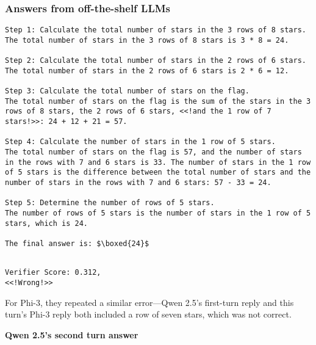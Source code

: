 \subsubsection{Answers from off-the-shelf LLMs}
\begin{lstlisting}
Step 1: Calculate the total number of stars in the 3 rows of 8 stars.
The total number of stars in the 3 rows of 8 stars is 3 * 8 = 24.

Step 2: Calculate the total number of stars in the 2 rows of 6 stars.
The total number of stars in the 2 rows of 6 stars is 2 * 6 = 12.

Step 3: Calculate the total number of stars on the flag.
The total number of stars on the flag is the sum of the stars in the 3 rows of 8 stars, the 2 rows of 6 stars, <<!and the 1 row of 7 stars!>>: 24 + 12 + 21 = 57.

Step 4: Calculate the number of stars in the 1 row of 5 stars.
The total number of stars on the flag is 57, and the number of stars in the rows with 7 and 6 stars is 33. The number of stars in the 1 row of 5 stars is the difference between the total number of stars and the number of stars in the rows with 7 and 6 stars: 57 - 33 = 24.

Step 5: Determine the number of rows of 5 stars.
The number of rows of 5 stars is the number of stars in the 1 row of 5 stars, which is 24.

The final answer is: $\boxed{24}$


\end{lstlisting}
\begin{lstlisting}
Verifier Score: 0.312,
<<!Wrong!>> 
\end{lstlisting}
For Phi-3, they repeated a similar error—Qwen 2.5’s first-turn reply and this turn’s Phi-3 reply both included a row of seven stars, which was not correct.

\textbf{Qwen 2.5's second turn answer }

